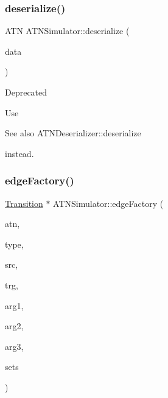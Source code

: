 \subsubsection{\texorpdfstring{deserialize()}{deserialize()}}
{\footnotesize\ttfamily A\+TN A\+T\+N\+Simulator\+::deserialize (\begin{DoxyParamCaption}\item[{const std\+::vector$<$ uint16\+\_\+t $>$ \&}]{data }\end{DoxyParamCaption})\hspace{0.3cm}{\ttfamily [static]}}

\begin{DoxyRefDesc}{Deprecated}
\item[\hyperlink{deprecated__deprecated000001}{Deprecated}]Use \begin{DoxySeeAlso}{See also}
A\+T\+N\+Deserializer\+::deserialize


\end{DoxySeeAlso}
instead. \end{DoxyRefDesc}
\mbox{\label{classantlr4_1_1atn_1_1ATNSimulator_a8e3fc8caefaecf90ac5eb45561aafdcc}} 
\subsubsection{\texorpdfstring{edge\+Factory()}{edgeFactory()}}
{\footnotesize\ttfamily \hyperlink{classantlr4_1_1atn_1_1Transition}{Transition} $\ast$ A\+T\+N\+Simulator\+::edge\+Factory (\begin{DoxyParamCaption}\item[{const A\+TN \&}]{atn,  }\item[{int}]{type,  }\item[{int}]{src,  }\item[{int}]{trg,  }\item[{int}]{arg1,  }\item[{int}]{arg2,  }\item[{int}]{arg3,  }\item[{const std\+::vector$<$ \hyperlink{classantlr4_1_1misc_1_1IntervalSet}{misc\+::\+Interval\+Set} $>$ \&}]{sets }\end{DoxyParamCaption})\hspace{0.3cm}{\ttfamily [static]}}


